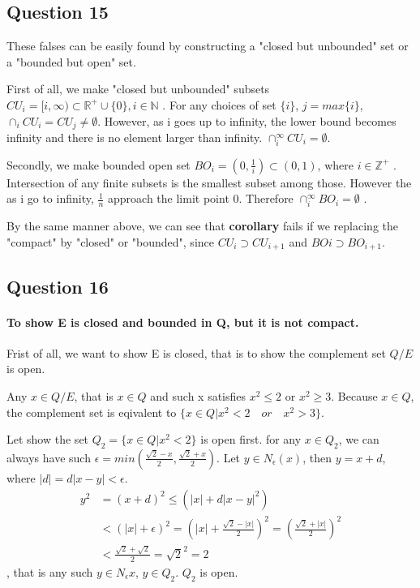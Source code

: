 \documentclass{article}
\begin{document}
\subsection*{Question 15}
These falses can be easily found by constructing a "closed but unbounded" set or a "bounded but open" set.

First of all, we make "closed but unbounded" subsets $CU_{i} = [i, \infty) \subset \mathbb{R}^{+} \cup \{ 0 \}, i \in \mathbb{N}$ .
For any choices of set $\{ i\}$, $j = max \{ i\}$, $\cap_i CU_{i} = CU_{j} \neq \emptyset$. However, as i goes up to infinity, the lower bound becomes infinity and there is no element larger than infinity. $\cap_{i}^{\infty} CU_{i} = \emptyset$.

Secondly, we make bounded open set $BO_{i}=(0,\frac{1}{i}) \subset (0,1)$, where $i \in \mathbb{Z}^{+}$ .
Intersection of any finite subsets is the smallest subset among those. However the as i go to infinity, $\frac{1}{n}$ approach the limit point 0.
Therefore $\cap_{i}^{\infty} BO_{i} = \emptyset$ .

By the same manner above, we can see that \textbf{corollary} fails if we replacing the "compact" by "closed" or "bounded", since $CU_{i} \supset CU_{i+1}$ and $BO{i} \supset BO_{i+1}$.

\subsection*{Question 16}
\paragraph{To show E is closed and bounded in Q, but it is not compact.}
Frist of all, we want to show E is closed, that is to show the complement set $Q/E$ is open.

Any $x \in Q/E$, that is $x \in Q$ and such x satisfies $x^2 \leq 2$ or $ x^2 \geq 3$. Because $x \in Q$, the complement set is eqivalent to $\{ x \in Q | x^2 < 2 \quad or \quad x^2 > 3 \}$.

Let show the set $ Q_{2} = \{ x \in Q | x^2 < 2  \}$ is open first. for any $x \in Q_{2} $, we can always have such $\epsilon = min(\frac{\sqrt{2}-x}{2},\frac{\sqrt{2}+x}{2})$. Let $y \in N_{\epsilon}(x)$, then $y = x + d$, where $ |d| = d|x-y| < \epsilon$.
\begin{equation}
  \begin{split}
    y^2 &= (x+d)^2 \leq (|x| + d|x-y|^2)\\
    &< (|x| + \epsilon)^2 = (|x| + \frac{\sqrt{2}-|x|}{2})^2 = (\frac{\sqrt{2}+|x|}{2})^2\\
    &< \frac{\sqrt{2}+\sqrt{2}}{2} = \sqrt{2}^2 = 2
  \end{split}
\end{equation}
 , that is any such $ y \in N_{\epsilon}{x}$, $y \in Q_{2}$. $Q_{2}$ is open.
\end{document}
